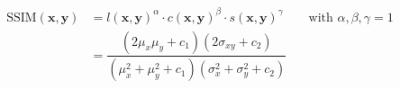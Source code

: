 \begin{align} \label{eq:ssim}
    \text{SSIM}(\pmb{x}, \pmb{y}) &= l(\pmb{x},\pmb{y})^\alpha \cdot c(\pmb{x},\pmb{y})^\beta \cdot s(\pmb{x},\pmb{y})^\gamma \qquad \text{with } \alpha, \beta, \gamma = 1 \\
    &= \dfrac{(2\mu_x \mu_y + c_1)(2\sigma_{xy} + c_2)}{(\mu_x^2 + \mu_y^2 + c_1)(\sigma_x^2 + \sigma_y^2 + c_2)}
\end{align}